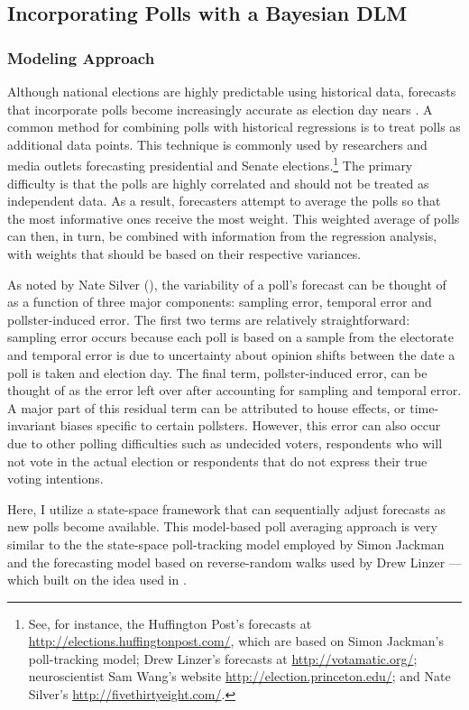 \documentclass[12pt,final,fleqn]{article}
\theoremstyle{plain}
\begin{document}
\subsection{Incorporating Polls with a Bayesian DLM}
\subsubsection{Modeling Approach}
Although national elections are highly predictable using historical data, forecasts that incorporate polls become increasingly accurate as election day nears \citet{linzer2013dynamic}. A common method for combining polls with historical regressions is to treat polls as additional data points. This technique is commonly used by researchers and media outlets forecasting presidential and Senate elections.\footnote{See, for instance, the Huffington Post's forecasts at \url{http://elections.huffingtonpost.com/}, which are based on Simon Jackman's poll-tracking model; Drew Linzer's forecasts at \url{http://votamatic.org/}; neuroscientist Sam Wang's website \url{http://election.princeton.edu/}; and Nate Silver's \url{http://fivethirtyeight.com/}.} The primary difficulty is that the polls are highly correlated and should not be treated as independent data. As a result, forecasters attempt to average the polls so that the most informative ones receive the most weight. This weighted average of polls can then, in turn, be combined with information from the regression analysis, with weights that should be based on their respective variances.

As noted by Nate Silver (\citeyear{silver2014ratings}), the variability of a poll's forecast can be thought of as a function of three major components: sampling error, temporal error and pollster-induced error. The first two terms are relatively straightforward: sampling error occurs because each poll is based on a sample from the electorate and temporal error is due to uncertainty about opinion shifts between the date a poll is taken and election day. The final term, pollster-induced error, can be thought of as the error left over after accounting for sampling and temporal error. A major part of this residual term can be attributed to house effects, or time-invariant biases specific to certain pollsters. However, this error can also occur due to other polling difficulties such as undecided voters, respondents who will not vote in the actual election or respondents that do not express their true voting intentions.

Here, I utilize a state-space framework that can sequentially adjust forecasts as new polls become available. This model-based poll averaging approach is very similar to the the state-space poll-tracking model employed by Simon Jackman \citep{jackman2005pooling, jackman2009bayesian} and the forecasting model based on reverse-random walks used by Drew Linzer \citep{linzer2013dynamic}---which built on the idea used in \citet{strauss2007florida}. 
\end{document}
